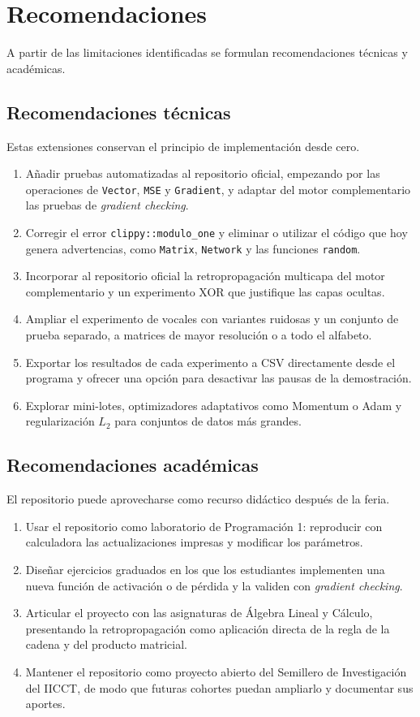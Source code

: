 \chapter{Recomendaciones}\label{cap:recomendaciones}
A partir de las limitaciones identificadas se formulan recomendaciones técnicas y académicas.

\section{Recomendaciones técnicas}
Estas extensiones conservan el principio de implementación desde cero.

\begin{enumerate}[leftmargin=2em,itemsep=1pt]
\item Añadir pruebas automatizadas al repositorio oficial, empezando por las operaciones de \texttt{Vector}, \texttt{MSE} y \texttt{Gradient}, y adaptar del motor complementario las pruebas de \emph{gradient checking}.
\item Corregir el error \texttt{clippy::modulo\_one} y eliminar o utilizar el código que hoy genera advertencias, como \texttt{Matrix}, \texttt{Network} y las funciones \texttt{random}.
\item Incorporar al repositorio oficial la retropropagación multicapa del motor complementario y un experimento XOR que justifique las capas ocultas.
\item Ampliar el experimento de vocales con variantes ruidosas y un conjunto de prueba separado, a matrices de mayor resolución o a todo el alfabeto.
\item Exportar los resultados de cada experimento a CSV directamente desde el programa y ofrecer una opción para desactivar las pausas de la demostración.
\item Explorar mini-lotes, optimizadores adaptativos como Momentum o Adam y regularización $L_2$ para conjuntos de datos más grandes.
\end{enumerate}

\section{Recomendaciones académicas}
El repositorio puede aprovecharse como recurso didáctico después de la feria.

\begin{enumerate}[leftmargin=2em,itemsep=1pt]
\item Usar el repositorio como laboratorio de Programación 1: reproducir con calculadora las actualizaciones impresas y modificar los parámetros.
\item Diseñar ejercicios graduados en los que los estudiantes implementen una nueva función de activación o de pérdida y la validen con \emph{gradient checking}.
\item Articular el proyecto con las asignaturas de Álgebra Lineal y Cálculo, presentando la retropropagación como aplicación directa de la regla de la cadena y del producto matricial.
\item Mantener el repositorio como proyecto abierto del Semillero de Investigación del IICCT, de modo que futuras cohortes puedan ampliarlo y documentar sus aportes.
\end{enumerate}

